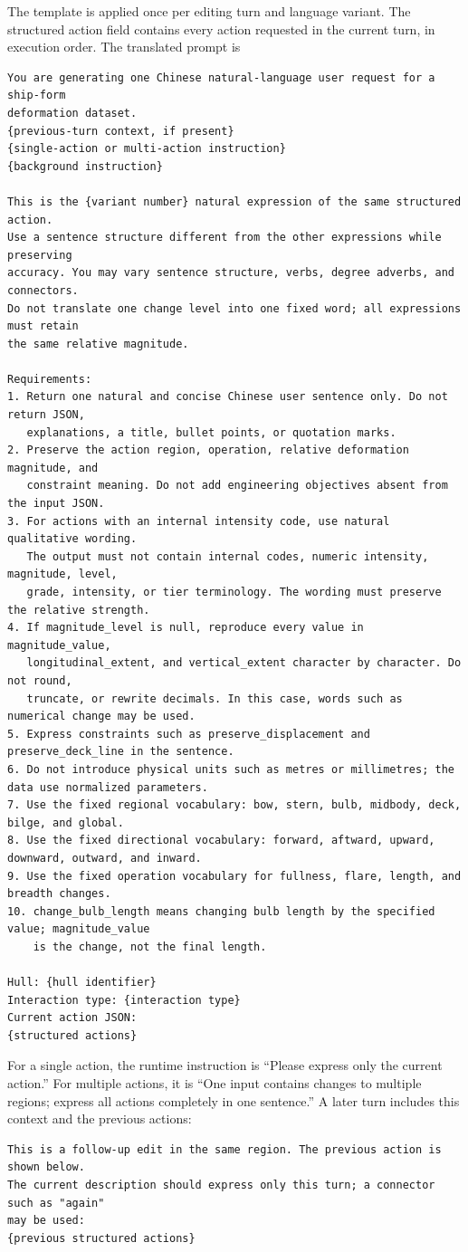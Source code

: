\documentclass[a4paper,fleqn]{cas-dc}
\begin{document}
The template is applied once per editing turn and language variant. The structured
action field contains every action requested in the current turn, in execution
order. The translated prompt is
\begingroup
\small
\begin{verbatim}
You are generating one Chinese natural-language user request for a ship-form
deformation dataset.
{previous-turn context, if present}
{single-action or multi-action instruction}
{background instruction}

This is the {variant number} natural expression of the same structured action.
Use a sentence structure different from the other expressions while preserving
accuracy. You may vary sentence structure, verbs, degree adverbs, and connectors.
Do not translate one change level into one fixed word; all expressions must retain
the same relative magnitude.

Requirements:
1. Return one natural and concise Chinese user sentence only. Do not return JSON,
   explanations, a title, bullet points, or quotation marks.
2. Preserve the action region, operation, relative deformation magnitude, and
   constraint meaning. Do not add engineering objectives absent from the input JSON.
3. For actions with an internal intensity code, use natural qualitative wording.
   The output must not contain internal codes, numeric intensity, magnitude, level,
   grade, intensity, or tier terminology. The wording must preserve the relative strength.
4. If magnitude_level is null, reproduce every value in magnitude_value,
   longitudinal_extent, and vertical_extent character by character. Do not round,
   truncate, or rewrite decimals. In this case, words such as numerical change may be used.
5. Express constraints such as preserve_displacement and preserve_deck_line in the sentence.
6. Do not introduce physical units such as metres or millimetres; the data use normalized parameters.
7. Use the fixed regional vocabulary: bow, stern, bulb, midbody, deck, bilge, and global.
8. Use the fixed directional vocabulary: forward, aftward, upward, downward, outward, and inward.
9. Use the fixed operation vocabulary for fullness, flare, length, and breadth changes.
10. change_bulb_length means changing bulb length by the specified value; magnitude_value
    is the change, not the final length.

Hull: {hull identifier}
Interaction type: {interaction type}
Current action JSON:
{structured actions}
\end{verbatim}
\endgroup

For a single action, the runtime instruction is ``Please express only the current
action.'' For multiple actions, it is ``One input contains changes to multiple
regions; express all actions completely in one sentence.'' A later turn includes
this context and the previous actions:
\begin{verbatim}
This is a follow-up edit in the same region. The previous action is shown below.
The current description should express only this turn; a connector such as "again"
may be used:
{previous structured actions}
\end{verbatim}
\end{document}
